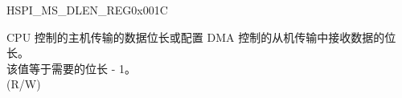 \begin{register}{H}{SPI\_MS\_DLEN\_REG}{0x001C}\label{regdesc:SPI3MSDLENREG}
%
%
\regnewline%
\begin{regdesc}\begin{reglist}
\label{fielddesc:SPI3MSDATABITLEN}\item [SPI\_MS\_DATA\_BITLEN] CPU 控制的主机传输的数据位长或配置 DMA 控制的从机传输中接收数据的位长。\\
该值等于需要的位长 - 1。 \\

(R/W)
\end{reglist}\end{regdesc}
\end{register}


